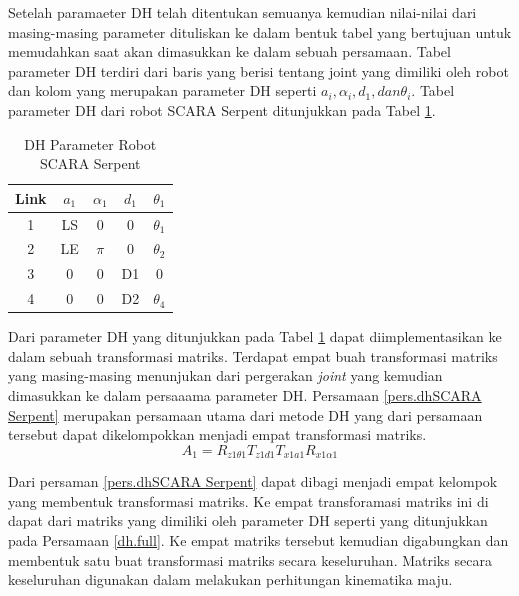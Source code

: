 Setelah paramaeter DH telah ditentukan semuanya kemudian nilai-nilai dari masing-masing parameter dituliskan ke dalam bentuk tabel yang bertujuan untuk memudahkan saat akan dimasukkan ke dalam sebuah persamaan. Tabel parameter DH terdiri dari baris yang berisi tentang joint yang dimiliki oleh robot dan kolom yang merupakan parameter DH seperti $a_{i},\alpha_{i}, d_{1}, dan \theta_{i}$. Tabel parameter DH dari robot SCARA Serpent ditunjukkan pada Tabel \ref{dh.SCARA Serpent}. 

\begin{table}[H]
	\centering
	\caption{DH Parameter Robot SCARA Serpent}
	\label{dh.SCARA Serpent}
	
	\begin{tabular}{|c|c|c|c|c|}
		\hline
		\rowcolor[HTML]{9B9B9B} 
		Link & $a_{1}$ & $\alpha_{1}$ & $d_{1}$ & $\theta_{1}$ \\ \hline
		1    & LS & 0      & 0     & $\theta_{1}$     \\ \hline
		2    & LE & $\pi$    & 0     & $\theta_{2}	$     \\ \hline
		3    & 0     & 0      & D1 & 0          \\ \hline
		4    & 0     & 0      & D2 & $\theta_{4}$ \\ \hline
	\end{tabular}
	
\end{table}

Dari parameter DH yang ditunjukkan pada Tabel \ref{dh.SCARA Serpent} dapat diimplementasikan ke dalam sebuah transformasi matriks. Terdapat empat buah transformasi matriks yang masing-masing menunjukan dari pergerakan \textit{joint} yang kemudian dimasukkan ke dalam persaaama parameter DH. Persamaan \ref{pers.dhSCARA Serpent} merupakan persamaan utama dari metode DH yang dari persamaan tersebut dapat dikelompokkan menjadi empat transformasi matriks.
\begin{equation}
A_{1} = R_{z1\theta1}T_{z1d1}T_{x1a1}R_{x1\alpha1}
\label{pers.dhSCARA Serpent}
\end{equation}

Dari persaman \ref{pers.dhSCARA Serpent} dapat dibagi menjadi empat kelompok yang membentuk transformasi matriks. Ke empat transforamasi matriks ini di dapat dari matriks yang dimiliki oleh parameter DH seperti yang ditunjukkan pada Persamaan \ref{dh.full}. Ke empat matriks tersebut kemudian digabungkan dan membentuk satu buat transformasi matriks secara keseluruhan. Matriks secara keseluruhan digunakan dalam melakukan perhitungan kinematika maju.

